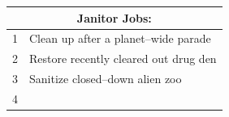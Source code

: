 \documentclass[a4,landscape]{book}
\begin{document}
\begin{multicols*}{4}
\begin{center}
  \begin{tabular}{|c|p{}|}
    \hline \multicolumn{2}{|c|}{Janitor Jobs:} \\
    \hline 1 & Clean up after a planet--wide parade \\
    2 & Restore recently cleared out drug den \\
    3 & Sanitize closed--down alien zoo \\
    4 & 
  \end{tabular}
\end{center}

\end{multicols*}
\end{document}
